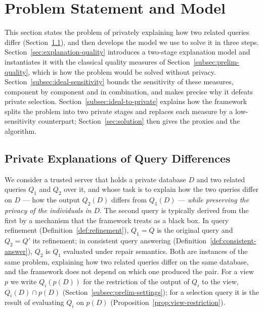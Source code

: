 
\section{Problem Statement and Model}\label{sec:model}

This section states the problem of privately explaining how two related queries differ (Section~\ref{subsec:private-query-difference-setting}), and then develops the model we use to solve it in three steps.
Section~\ref{sec:explanation-quality} introduces a two-stage explanation model and instantiates it with the classical quality measures of Section~\ref{subsec:prelim-quality}, which is how the problem would be solved without privacy.
Section~\ref{subsec:ideal-sensitivity} bounds the sensitivity of these measures, component by component and in combination, and makes precise why it defeats private selection.
Section~\ref{subsec:ideal-to-private} explains how the framework splits the problem into two private stages and replaces each measure by a low-sensitivity counterpart; Section~\ref{sec:solution} then gives the proxies and the algorithm.

\subsection{Private Explanations of Query Differences}
\label{subsec:private-query-difference-setting}

We consider a trusted server that holds a private database $D$ and two related queries $Q_1$ and $Q_2$ over it, and whose task is to explain how the two queries differ on $D$ --- how the output $Q_2(D)$ differs from $Q_1(D)$ --- \emph{while preserving the privacy of the individuals in $D$}.
The second query is typically derived from the first by a mechanism that the framework treats as a black box.
In query refinement (Definition~\ref{def:refinement}), $Q_1=Q$ is the original query and $Q_2=Q'$ its refinement; in consistent query answering (Definition~\ref{def:consistent-answer}), $Q_2$ is $Q_1$ evaluated under repair semantics.
Both are instances of the same problem, explaining how two related queries differ on the same database, and the framework does not depend on which one produced the pair.
For a view $p$ we write $Q_i(p(D))$ for the restriction of the output of $Q_i$ to the view, $Q_i(D)\cap p(D)$ (Section~\ref{subsec:prelim-settings}); for a selection query it is the result of evaluating $Q_i$ on $p(D)$ (Proposition~\ref{prop:view-restriction}).

